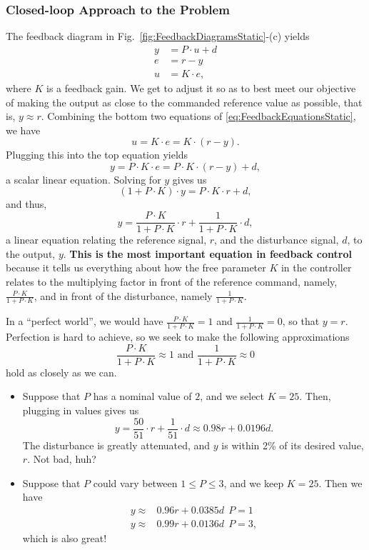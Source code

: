 \subsubsection{Closed-loop Approach to the Problem}

The feedback diagram in Fig.~\ref{fig:FeedbackDiagramsStatic}-(c) yields 
\begin{equation}
\label{eq:FeedbackEquationsStatic}
    \begin{aligned}
        y &= P \cdot u + d \\
        e &= r - y \\
        u & = K\cdot e,
    \end{aligned}
\end{equation}
where $K$ is a feedback gain. We get to adjust it so as to best meet our objective of making the output as close to the commanded reference value as possible, that is, $y \approx r$. Combining the bottom two equations of \eqref{eq:FeedbackEquationsStatic}, we have 
$$ u = K\cdot e = K\cdot (r - y).$$
Plugging this into the top equation yields
$$ y = P \cdot  K\cdot e = P \cdot K\cdot \left(  r - y \right) + d, $$
a scalar linear equation. Solving for $y$ gives us
$$ (1 + P \cdot K) \cdot y = P \cdot K \cdot r + d,$$
and thus,
\begin{equation}
    y = \frac{P \cdot K }{1 + P \cdot K}\cdot r + \frac{1}{1 + P \cdot K} \cdot d,
\end{equation}
a linear equation relating the reference signal, $r$, and the disturbance signal, $d$, to the output, $y$.
\textbf{This is the most important equation in feedback control} because it tells us everything about how the free parameter $K$ in the controller relates to the multiplying factor in front of the reference command, namely, $\frac{P \cdot K }{1 + P \cdot K}$, and in front of the disturbance, namely  $\frac{1}{1 + P \cdot K}$. 

In a ``perfect world'', we would have $\frac{P \cdot K }{1 + P \cdot K} = 1$ and $\frac{1}{1 + P \cdot K} = 0$, so that $y = r$. Perfection is hard to achieve, so we seek to make the following approximations 
$$  \frac{P \cdot K }{1 + P \cdot K} \approx 1 \text{ and } \frac{1}{1 + P \cdot K} \approx 0$$
hold as closely as we can.

\begin{itemize}
    \item Suppose that $P$ has a nominal value of $2$, and we select $K=25$. Then, plugging in values gives us
$$ y = \frac{50}{51} \cdot r + \frac{1}{51} \cdot d \approx 0.98 r + 0.0196 d.$$
The disturbance is greatly attenuated, and $y$ is within 2\% of its desired value, $r$. Not bad, huh?

\item Suppose that $P$ could vary between $1 \le P \le 3$, and we keep $K=25$. Then we have 
\begin{align*}
    y \approx&  0.96 r + 0.0385 d ~~P=1\\
    y \approx&  0.99 r + 0.0136 d ~~P=3,
\end{align*}
which is also great! 
\end{itemize}

